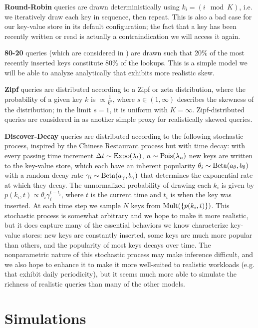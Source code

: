 \documentclass[11pt]{article}
\newcommand{\Beta}{\textnormal{Beta}}
\newcommand{\Mult}{\textnormal{Mult}}
\newcommand{\Expo}{\textnormal{Expo}}
\newcommand{\Pois}{\textnormal{Pois}}
\begin{document}
\textbf{Round-Robin} queries are drawn deterministically using $k_i = (i \mod K)$, i.e. we iteratively draw each key in sequence, then repeat. This is also a bad case for our key-value store in its default configuration; the fact that a key has been recently written or read is actually a contraindication we will access it again.

\textbf{80-20} queries (which are considered in \citet{monkey}) are drawn such that 20\% of the most recently inserted keys constitute 80\% of the lookups. This is a simple model we will be able to analyze analytically that exhibits more realistic skew.

\textbf{Zipf} queries are distributed according to a Zipf or zeta distribution, where the probability of a given key $k$ is $\propto \frac{1}{k^s}$, where $s \in (1, \infty)$ describes the skewness of the distribution; in the limit $s=1$, it is uniform with $K=\infty$. Zipf-distributed queries are considered in \citet{art} as another simple proxy for realistically skewed queries.

\textbf{Discover-Decay} queries are distributed according to the following stochastic process, inspired by the Chinese Restaurant process \cite{crp} but with time decay: with every passing time increment $\Delta t \sim \Expo(\lambda_t)$, $n \sim \Pois(\lambda_n)$ new keys are written to the key-value store, which each have an inherent popularity $\theta_i \sim \Beta(a_\theta,b_\theta)$ with a random decay rate $\gamma_i \sim \Beta(a_\gamma,b_\gamma)$ that determines the exponential rate at which they decay. The unnormalized probability of drawing each $k_i$ is given by $p(k_i,t) \propto \theta_i\gamma_i^{t-t_i}$, where $t$ is the current time and $t_i$ is when the key was inserted. At each time step we sample $N$ keys from $\Mult(\{p(k_i,t)\})$. This stochastic process is somewhat arbitrary and we hope to make it more realistic, but it does capture many of the essential behaviors we know characterize key-value stores: new keys are constantly inserted, some keys are much more popular than others, and the popularity of most keys decays over time. The nonparametric nature of this stochastic process may make inference difficult, and we also hope to enhance it to make it more well-suited to realistic workloads (e.g. that exhibit daily periodicity), but it seems much more able to simulate the richness of realistic queries than many of the other models.

\section{Simulations}
\end{document}
